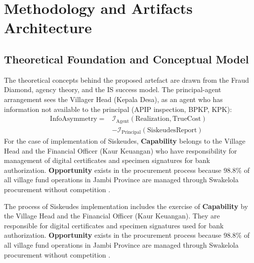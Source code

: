\documentclass[conference]{IEEEtran}
\begin{document}
\section{Methodology and Artifacts Architecture}

\subsection{Theoretical Foundation and Conceptual Model}

The theoretical concepts behind the proposed artefact are drawn from the Fraud Diamond, agency theory, and the IS success model. The principal-agent arrangement sees the Villager Head (Kepala Desa), as an agent who has information not available to the principal (APIP inspection, BPKP, KPK):
\begin{equation}
\begin{aligned}
\mathrm{InfoAsymmetry} = {} & \mathcal{I}_{\mathrm{Agent}}(\mathrm{Realization}, \mathrm{TrueCost}) \\
& - \mathcal{I}_{\mathrm{Principal}}(\mathrm{SiskeudesReport})
\end{aligned}
\end{equation}
For the case of implementation of Siskeudes, \textbf{Capability} belongs to the Village Head and the Financial Officer (Kaur Keuangan) who have responsibility for management of digital certificates and specimen signatures for bank authorization. \textbf{Opportunity} exists in the procurement process because 98.8\% of all village fund operations in Jambi Province are managed through Swakelola procurement without competition \cite{ref9}.

The process of Siskeudes implementation includes the exercise of \textbf{Capability} by the Village Head and the Financial Officer (Kaur Keuangan). They are responsible for digital certificates and specimen signatures used for bank authorization. \textbf{Opportunity} exists in the procurement process because 98.8\% of all village fund operations in Jambi Province are managed through Swakelola procurement without competition \cite{ref9}.
\end{document}
